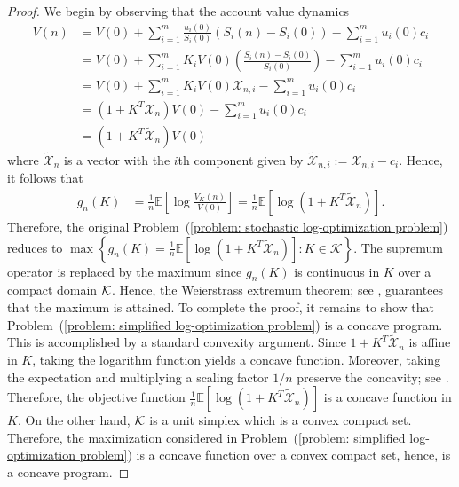 \documentclass[10pt]{article} %
\begin{document}
	\begin{proof}
		We begin by observing that the account value dynamics 
		\begin{align}
			V(n) 
			&= V(0) + \sum_{i=1}^m \frac{u_i(0)}{S_i(0)} (S_i(n) - S_i(0))- \sum_{i=1}^m u_i(0)c_i \nonumber \\ 
			&= V(0) + \sum_{i=1}^m K_i V(0) \left( \frac{S_i(n) - S_i(0)}{S_i(0)} \right)- \sum_{i=1}^m u_i(0)c_i \nonumber \\ 
			&= V(0) + \sum_{i=1}^m K_i V(0) \mathcal{X}_{n,i}- \sum_{i=1}^m u_i(0)c_i \nonumber \\ 
			&= (1 + K^T\mathcal{X}_n) V(0) - \sum_{i=1}^m u_i(0)c_i \nonumber \\
			&= (1 + K^T\widetilde{\mathcal{X}}_n ) V(0) \label{eq: account value}
		\end{align}
		where $\widetilde{\mathcal{X}}_n$ is a vector with the $i$th component given by
		$
		\widetilde{\mathcal{X}}_{n,i} := \mathcal{X}_{n,i} - c_i
		$.
		Hence, it follows that
		\begin{align*}
			{g_n}(K) 
			&=  \frac{1}{n}\mathbb{E}\left[ \log \frac{V_K(n)}{V(0)} \right] 
			= \frac{1}{n}\mathbb{E}\left[ {\log (1 + {K^T}{ \widetilde{\mathcal{X}}_n})} \right].
		\end{align*}
		Therefore, the original Problem~(\ref{problem: stochastic log-optimization problem}) reduces to
		$
		\max \left\{g_n(K) = \frac{1}{n}\mathbb{E}\left[ {\log (1 + {K^T}{ \widetilde{\mathcal{X}}_n})} \right] : K \in \mathcal{K}\right\}.
		$
		The supremum operator is replaced by the maximum since $g_n(K)$ is continuous in $K$ over a compact domain $\cal K$.  Hence, the Weierstrass extremum theorem; see \cite{rudin1964principles}, guarantees that the maximum is attained.
		To complete the proof, it remains to show that Problem~(\ref{problem: simplified log-optimization problem}) is a concave program. This is accomplished by a standard convexity argument.
		Since $1+K^T\widetilde{ \mathcal{X} }_n$ is affine in $K$, taking the logarithm function yields a concave function. 
		Moreover, taking the expectation and multiplying a scaling factor $1/n$ preserve the concavity; see \cite{boyd2004convex}. 
		Therefore, the objective function $\frac{1}{n}\mathbb{E}\left[ {\log (1 + {K^T}{ \widetilde{\mathcal{X}}_n})} \right]$ is a concave function in $K$. On the other hand, $\cal K$ is a unit simplex which is a convex compact set. Therefore, the maximization considered in Problem~(\ref{problem: simplified log-optimization problem}) is a concave function over a convex compact set, hence, is a concave program.
	\end{proof}
	
\end{document}
